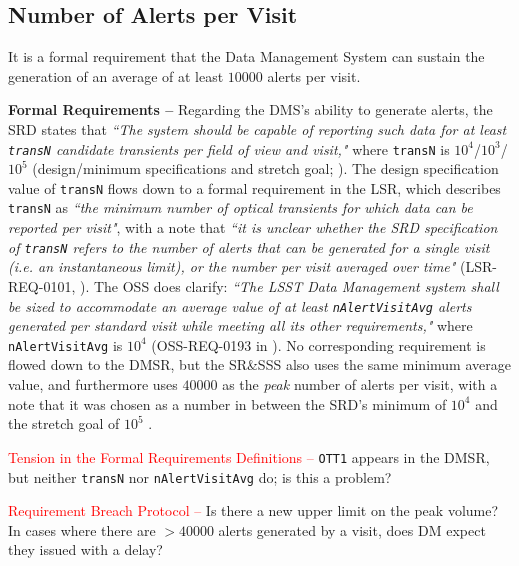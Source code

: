 \documentclass[DM,authoryear,toc]{lsstdoc}
\begin{document}
\subsection{Number of Alerts per Visit}\label{ssec:transN}

It is a formal requirement that the Data Management System can sustain the generation of an average of at least $10000$ alerts per visit. 

{\bf Formal Requirements --} Regarding the DMS's ability to generate alerts, the SRD states that {\it ``The system should be capable of reporting such data for at least {\tt transN} candidate transients per field of view and visit,"} where {\tt transN} is $10^4$/$10^3$/$10^5$ (design/minimum specifications and stretch goal; ). The design specification value of {\tt transN} flows down to a formal requirement in the LSR, which describes {\tt transN} as {\it ``the minimum number of optical transients for which data can be reported per visit"}, with a note that {\it ``it is unclear whether the SRD specification of {\tt transN} refers to the number of alerts that can be generated for a single visit (i.e. an instantaneous limit), or the number per visit averaged over time"} (LSR-REQ-0101, ). The OSS does clarify: {\it ``The LSST Data Management system shall be sized to accommodate an average value of at least {\tt nAlertVisitAvg} alerts generated per standard visit while meeting all its other requirements,"} where {\tt nAlertVisitAvg} is $10^4$ (OSS-REQ-0193 in ). No corresponding requirement is flowed down to the DMSR, but the SR\&SSS also uses the same minimum average value, and furthermore uses $40000$ as the {\it peak} number of alerts per visit, with a note that it was chosen as a number in between the SRD's minimum of $10^4$ and the stretch goal of $10^5$ . 

\textcolor{red}{Tension in the Formal Requirements Definitions --} {\tt OTT1} appears in the DMSR, but neither {\tt transN} nor {\tt nAlertVisitAvg} do; is this a problem?

\textcolor{red}{Requirement Breach Protocol --} Is there a new upper limit on the peak volume? In cases where there are $>40000$ alerts generated by a visit, does DM expect they issued with a delay?

\end{document}
